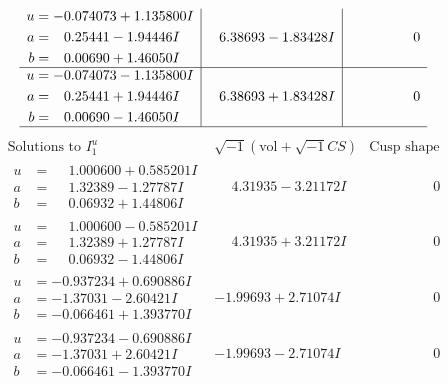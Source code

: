 \documentclass[1p]{elsarticle_modified}
\theoremstyle{definition}
\newcommand{\I}{\sqrt{-1}}
\begin{document}
$$\begin{array}{c|c|c}
\begin{aligned}
u &= -0.074073 + 1.135800 I \\
a &= \phantom{-}0.25441 - 1.94446 I \\
b &= \phantom{-}0.00690 + 1.46050 I\end{aligned}
 & \phantom{-}6.38693 - 1.83428 I & \phantom{-0.000000 } 0 \\ \hline\begin{aligned}
u &= -0.074073 - 1.135800 I \\
a &= \phantom{-}0.25441 + 1.94446 I \\
b &= \phantom{-}0.00690 - 1.46050 I\end{aligned}
 & \phantom{-}6.38693 + 1.83428 I & \phantom{-0.000000 } 0\\
 \hline 
 \end{array}$$\newpage$$\begin{array}{c|c|c}  
\text{Solutions to }I^u_{1}& \I (\text{vol} + \sqrt{-1}CS) & \text{Cusp shape}\\
 \hline 
\begin{aligned}
u &= \phantom{-}1.000600 + 0.585201 I \\
a &= \phantom{-}1.32389 - 1.27787 I \\
b &= \phantom{-}0.06932 + 1.44806 I\end{aligned}
 & \phantom{-}4.31935 - 3.21172 I & \phantom{-0.000000 } 0 \\ \hline\begin{aligned}
u &= \phantom{-}1.000600 - 0.585201 I \\
a &= \phantom{-}1.32389 + 1.27787 I \\
b &= \phantom{-}0.06932 - 1.44806 I\end{aligned}
 & \phantom{-}4.31935 + 3.21172 I & \phantom{-0.000000 } 0 \\ \hline\begin{aligned}
u &= -0.937234 + 0.690886 I \\
a &= -1.37031 - 2.60421 I \\
b &= -0.066461 + 1.393770 I\end{aligned}
 & -1.99693 + 2.71074 I & \phantom{-0.000000 } 0 \\ \hline\begin{aligned}
u &= -0.937234 - 0.690886 I \\
a &= -1.37031 + 2.60421 I \\
b &= -0.066461 - 1.393770 I\end{aligned}
 & -1.99693 - 2.71074 I & \phantom{-0.000000 } 0 \\ \hline\begin{aligned}

\end{aligned}
\end{array}$$
\end{document}
